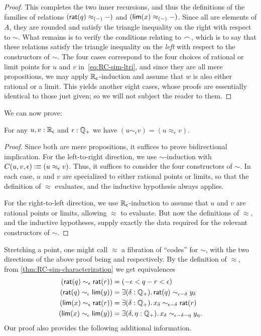 \begin{proof}
  This completes the two inner recursions, and thus the definitions of the families of relations $(\mathsf{rat}(q)\approx_{(-)}-)$ and $(\mathsf{lim}(x)\approx_{(-)}-)$.
  Since all are elements of $A$, they are rounded and satisfy the triangle inequality on the right with respect to $\sim$.
  What remains is to verify the conditions relating to $\frown$, which is to say that these relations satisfy the triangle inequality on the \emph{left} with respect to the constructors of $\sim$.
  The four cases correspond to the four choices of rational or limit points for $u$ and $v$ in~\eqref{eq:RC-sim-ltri}, and since they are all mere propositions, we may apply $\mathbb{R}_\mathsf{c}$-induction and assume that $w$ is also either rational or a limit.
  This yields another eight cases, whose proofs are essentially identical to those just given; so we will not subject the reader to them.
\end{proof}

We can now prove:

\begin{thm}\label{thm:RC-sim-characterization}
  For any $u,v:\mathbb{R}_\mathsf{c}$ and $\epsilon:\mathbb{Q}_{+}$ we have $(u\sim_\epsilon v) = (u\approx_\epsilon v)$.
\end{thm}
\begin{proof}
  Since both are mere propositions, it suffices to prove bidirectional implication.
  For the left-to-right direction, we use $\sim$-induction with $C(u,v,\epsilon)\vcentcolon\equiv (u\approx_\epsilon v)$.
  Thus, it suffices to consider the four constructors of $\sim$.
  In each case, $u$ and $v$ are specialized to either rational points or limits, so that the definition of $\approx$ evaluates, and the inductive hypothesis always applies.

  For the right-to-left direction, we use $\mathbb{R}_\mathsf{c}$-induction to assume that $u$ and $v$ are rational points or limits, allowing $\approx$ to evaluate.
  But now the definitions of $\approx$, and the inductive hypotheses, supply exactly the data required for the relevant constructors of $\sim$.
\end{proof}

Stretching a point, one might call $\approx$ a fibration of ``codes'' for $\sim$, with the two directions of the above proof being \encode and \decode respectively.
By the definition of $\approx$, from \autoref{thm:RC-sim-characterization} we get equivalences
\begin{align*}
  (\rcrat(q) \sim_\epsilon \rcrat(r))  &=
  (-\epsilon < q - r < \epsilon)\\
  (\rcrat(q) \sim_\epsilon \rclim(y)) &=
  \exis{\delta : \Qp} \rcrat(q) \sim_{\epsilon - \delta} y_\delta\\
  (\rclim(x) \sim_\epsilon \rcrat(r)) &=
  \exis{\delta : \Qp} x_\delta \sim_{\epsilon - \delta} \rcrat(r)\\
  (\rclim(x) \sim_\epsilon \rclim(y)) &=
  \exis{\delta, \eta : \Qp} x_\delta \sim_{\epsilon - \delta - \eta} y_\eta.
\end{align*}
Our proof also provides the following additional information.

